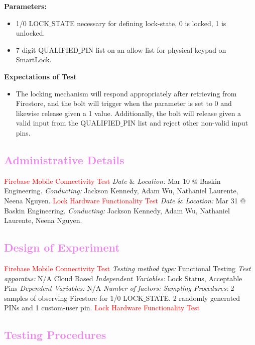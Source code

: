 \textbf{Parameters:}
\begin{itemize}

\item 1/0 LOCK$\_$STATE necessary for defining lock-state, 0 is locked, 1 is unlocked.
\item 7 digit QUALIFIED$\_$PIN list on an allow list for physical keypad on SmartLock.

\end{itemize}
\textbf{Expectations of Test}
\begin{itemize}

\item The locking mechanism will respond appropriately after retrieving from Firestore, and the bolt will trigger when the parameter is set to 0 and likewise release given a 1 value. Additionally, the bolt will release given a valid input from the QUALIFIED$\_$PIN list and reject other non-valid input pins.

\end{itemize}
\textcolor{violet}{\subsection{Administrative Details}}
\noindent\textcolor{red}{Firebase Mobile Connectivity Test}
\newline
\newline
\textit{Date $\&$ Location:} Mar 10 @ Baskin Engineering.
\newline
\textit{Conducting:} Jackson Kennedy, Adam Wu, Nathaniel Laurente, Neena Nguyen.
\newline
\newline
\textcolor{red}{Lock Hardware Functionality Test}
\newline
\newline
\textit{Date $\&$ Location:} Mar 31 @ Baskin Engineering.
\newline
\textit{Conducting:} Jackson Kennedy, Adam Wu, Nathaniel Laurente, Neena Nguyen.
\newline
\textcolor{violet}{\subsection{Design of Experiment}}
\noindent\textcolor{red}{Firebase Mobile Connectivity Test}
\newline
\textit{Testing method type:} Functional Testing
\newline
\textit{Test apparatus:} N/A Cloud Based
\newline
\textit{Independent Variables:} Lock Status, Acceptable Pins
\newline
\textit{Dependent Variables:} N/A
\newline
\textit{Number of factors:}
\newline
\textit{Sampling Procedures:} 2 samples of observing Firestore for 1/0 LOCK$\_$STATE. 2 randomly generated PINs and 1 custom-user pin.
\newline
\textcolor{red}{Lock Hardware Functionality Test}
\textcolor{violet}{\subsection{Testing Procedures}}